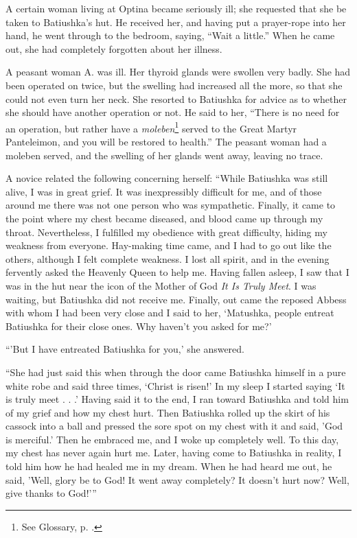 A certain woman living at Optina became seriously ill; she requested that she be taken to Batiushka's hut. He received her, and having put a prayer-rope into her hand, he went through to the bedroom, saying, “Wait a little.” When he came out, she had completely forgotten about her illness.

A peasant woman A. was ill. Her thyroid glands were swollen very badly. She had been operated on twice, but the swelling had increased all the more, so that she could not even turn her neck. She resorted to Batiushka for advice as to whether she should have another operation or not. He said to her, “There is no need for an operation, but rather have a \textit{moleben}\footnote{See Glossary, p. \pageref{moleben}.} served to the Great Martyr Panteleimon, and you will be restored to health.” The peasant woman had a moleben served, and the swelling of her glands went away, leaving no trace.

A novice related the following concerning herself: “While Batiushka was still alive, I was in great grief. It was inexpressibly difficult for me, and of those around me there was not one person who was sympathetic. Finally, it came to the point where my chest became diseased, and blood came up through my throat. Nevertheless, I fulfilled my obedience with great difficulty, hiding my weakness from everyone. Hay-making time came, and I had to go out like the others, although I felt complete weakness. I lost all spirit, and in the evening fervently asked the Heavenly Queen to help me. Having fallen asleep, I saw that I was in the hut near the icon of the Mother of God \textit{It Is Truly Meet}. I was waiting, but Batiushka did not receive me. Finally, out came the reposed Abbess with whom I had been very close and I said to her, ‘Matushka, people entreat Batiushka for their close ones. Why haven't you asked for me?'

“'But I have entreated Batiushka for you,' she answered.

“She had just said this when through the door came Batiushka himself in a pure white robe and said three times, ‘Christ is risen!' In my sleep I started saying ‘It is truly meet . . .' Having said it to the end, I ran toward Batiushka and told him of my grief and how my chest hurt. Then Batiushka rolled up the skirt of his cassock into a ball and pressed the sore spot on my chest with it and said, 'God is merciful.' Then he embraced me, and I woke up completely well. To this day, my chest has never again hurt me. Later, having come to Batiushka in reality, I told him how he had healed me in my dream. When he had heard me out, he said, 'Well, glory be to God! It went away completely? It doesn't hurt now? Well, give thanks to God!'”

